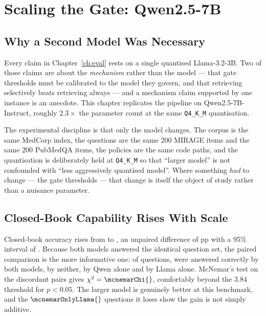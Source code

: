 
\chapter{Scaling the Gate: Qwen2.5-7B}
\label{ch:qwen}

\section{Why a Second Model Was Necessary}
\label{sec:qwen-why}

Every claim in Chapter~\ref{ch:eval} rests on a single quantised
Llama-3.2-3B. Two of those claims are about the \emph{mechanism} rather than
the model --- that gate thresholds must be calibrated to the model they
govern, and that retrieving selectively beats retrieving always --- and a
mechanism claim supported by one instance is an anecdote. This chapter
replicates the pipeline on Qwen2.5-7B-Instruct, roughly $2.3\times$ the
parameter count at the same \texttt{Q4\_K\_M} quantisation.

The experimental discipline is that only the model changes. The corpus is the
same MedCorp index, the questions are the same 200 MIRAGE items and the same
200 PubMedQA items, the policies are the same code paths, and the
quantisation is deliberately held at \texttt{Q4\_K\_M} so that ``larger
model'' is not confounded with ``less aggressively quantised model''. Where
something \emph{had} to change --- the gate thresholds --- that change is
itself the object of study rather than a nuisance parameter.



\section{Closed-Book Capability Rises With Scale}
\label{sec:qwen-closedbook}

Closed-book accuracy rises from \accPthreeMcq{} to \accQwenPthreeMcq{}, an
unpaired difference of \diffQwenLlamaMcq{}pp with a 95\% interval of
\diffQwenLlamaMcqCI{}. Because both models answered the identical question
set, the paired comparison is the more informative one: of \mcnemarN{}
questions, \mcnemarBoth{} were answered correctly by both models,
\mcnemarNeither{} by neither, \mcnemarOnlyQwen{} by Qwen alone and
\mcnemarOnlyLlama{} by Llama alone. McNemar's test on the discordant pairs
gives $\chi^2 = \mcnemarChi{}$, comfortably beyond the $3.84$ threshold for
$p < 0.05$. The larger model is genuinely better at this benchmark, and the
$\mcnemarOnlyLlama{}$ questions it loses show the gain is not simply
additive.

